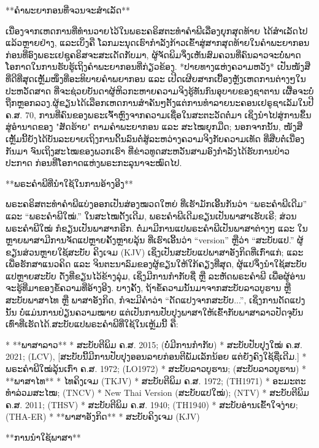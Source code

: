 
**ຄຳພະຍາກອນທີ່ຈວນຈະສຳເລັດ**

ເນື່ອງຈາກເຫດການທີ່ທຳນວາຍໄວ້ໃນພຣະຄຣິສຕະທຳຄຳພີເລື່ອງຍຸກສຸດທ້າຍ ໄດ້ສຳເລັດໄປແລ້ວຫຼາຍຢ່າງ, ແລະເບິ່ງຄື ໂລກມະນຸດເຮົາກຳລັງກ້າວເຂົ້າສູ່ສາກສຸດທ້າຍໃນຄຳພະຍາກອນ ກ່ອນທີ່ອົງພຣະເຢຊູຄຣິສຈະສະເດັດກັບມາ, ຜູ້ຈັດພິມຈຶ່ງເຫັນສົມຄວນທີ່ຄົນລາວຈະບໍ່ພາດໂອກາດໃນການຮັບຮູ້ເຖິງຄຳພະຍາກອນທີ່ກ່ຽວຂ້ອງ. *ປາຍທາງແຫ່ງຄວາມຫວັງ* ເປັນໜັງສືທີ່ດີທີ່ສຸດເຫຼັ້ມໜຶ່ງທີ່ອະທິບາຍຄຳພຍາກອນ ແລະ ເປີດເຜີຍສາກເບື້ອງຫຼັງເຫດການຕ່າງໆໃນປະຫວັດສາດ ທີ່ຈະຊ່ວຍບັນດາຜູ້ຫິວກະຫາຍຄວາມຈິງຮູ້ທັນກົນອຸບາຍຂອງຊາຕານ ເຜື້ອຈະບໍ່ຖືກຫຼອກລວງ.ຜູ້ຂຽນໄດ້ເລືອກເຫດການສຳຄັນໆຕັ້ງແຕ່ການທຳລາຍນະຄອນເຢຣູຊາເລັມໃນປີ ຄ.ສ. 70, ການທີ່ຄົນຂອງພຣະເຈົ້າຫຼົງຈາກຄວາມເຊື່ອໃນສະຕະວັດຕໍ່ມາ ເຊິ່ງນຳໄປສູ່ການຂຶ້ນສູ່ອຳນາດຂອງ "ສັດຮ້າຍ" ຕາມຄຳພະຍາກອນ ແລະ ສະໄໝຍຸກມືດ; ນອກຈາກນັ້ນ, ໜັງສືເຫຼັ້ມນີ້ຍັງໄດ້ບັນລະຍາຍເຖິງການດິ້ນລົນຕໍ່ສູ້ລະຫວ່າງຄວາມຈິງກັບຄວາມເທັດ ທີ່ສືບຕໍ່ເນື່ອງກັນມາ ຈົນເຖິງສະໄໝຂອງພວກເຮົາ ທີ່ຂ່າວທູດສະຫວັນສາມອົງກຳລັງໄດ້ຮັບການປ່າວປະກາດ ກ່ອນທີ່ໂອກາດແຫ່ງພຣະກະລຸນາຈະໝົດໄປ.

**ພຣະຄຳພີທີ່ນຳໃຊ້ໃນການອ້າງອີງ**

ພຣະຄຣິສຕະທຳຄຳພີແບ່ງອອກເປັນສ່ອງໝວດໃຫຍ່ ທີ່ເຮັາມັກເອີ້ນກັນວ່າ “ພຣະຄຳພີເດີມ” ແລະ “ພຣະຄຳພີໃໝ່.” ໃນສະໄໝດັ້ງເດີມ, ພຣະຄຳພີເດີມຂຽນເປັນພາສາເຮັບເຣີ; ສ່ວນພຣະຄຳພີໃໝ່ ກໍຂຽນເປັນພາສາກຣີກ. ຕໍ່ມາມີການແປພຣະຄຳພີເປັນພາສາຕ່າງໆ ແລະ ໃນຫຼາຍພາສາມີການຈັດແປຫຼາຍຄັ້ງຫຼາຍລຸ້ນ ທີ່ເຮົາເອີ້ນວ່າ “version” ຫຼືວ່າ “ສະບັບແປ.” ຜູ້ຂຽນສ່ວນຫຼາຍໃຊ້ສະບັບ ຄິງເຈມ (KJV) ເຊິ່ງເປັນສະບັບແປພາສາອັງກິດທີ່ເກົ່າແກ່; ແລະເພື່ອຮັກສາແນວຄິດ ແລະ ຈິນຕະນາລົມຂອງຜູ້ຂຽນໃຫ້ໃກ້ຄຽງທີ່ສຸດ, ຜູ້ແປຈຶ່ງນຳໃຊ້ສະບັບແປຫຼາຍສະບັບ ດັ່ງທີ່ຂຽນໄວ້ຂ້າງລຸ່ມ, ເຊິ່ງມີການກຳກັບຊື່ ຫຼື ລະຫັດພຣະຄຳພີ ເພື່ອຜູ້ອ່ານຈະຮູ້ທີ່ມາຂອງຂໍ້ຄວາມທີ່ອ້າງອີງ. ບາງຄັ້ງ, ຖ້າຂໍ້ຄວາມນັ້ນມາຈາກສະບັບລາວບູຮານ ຫຼື ສະບັບພາສາໄທ ຫຼື ພາສາອັງກິດ, ກໍຈະມີຄຳວ່າ “ດັດແປງຈາກສະບັບ...”, ເຊິ່ງການດັດແປງນັ້ນ ບໍ່ແມ່ນການປ່ຽນຄວາມໝາຍ ແຕ່ເປັນການປັບປຸງພາສາໃຫ້ເຂົ້າກັບພາສາລາວປັດຈຸບັນເທົ່າທີ່ເຮັດໄດ້.ສະບັບແປພຣະຄຳພີທີ່ໃຊ້ໃນເຫຼ້ມນີ້ ຄື:

    * **ພາສາລາວ**
        * ສະບັບຕີພິມ ຄ.ສ. 2015; (ບໍ່ມີການກຳກັບ)
        * ສະບັບປັບປຸງໃໝ່ ຄ.ສ. 2021; (LCV), [ສະບັບນີ້ມີການປັບປຸງອອນລາຍກ່ອນຕີພັມເລັກນ້ອຍ ແຕ່ຍັງຄົງໃຊ້ຊື່ເດີມ.]
        * ພຣະຄຳພີໃໝ່ລຸ້ນເກົ່າ ຄ.ສ. 1972; (LO1972)
        * ສະບັບລາວບູຮານ; (ສະບັບລາວບູຮານ)
    * **ພາສາໄທ**
        * ໄທຄິງເຈມ (TKJV)
        * ສະບັບຕີພິມ ຄ.ສ. 1972; (TH1971)
        * ອະມະຕະທຳລ່ວມສະໄໝ; (TNCV)
        * New Thai Version (ສະບັບແປໃໝ່); (NTV)
        * ສະບັບຕີພິມ ຄ.ສ. 2011; (THSV)
        * ສະບັບຕີພິມ ຄ.ສ. 1940; (TH1940)
        * ສະບັບອ່ານເຂົ້າໃຈງ່າຍ; (THA-ER)
    * **ພາສາອັງກິດ**
        * ສະບັບຄິງເຈມ (KJV)

**ການນຳໃຊ້ພາສາ**

